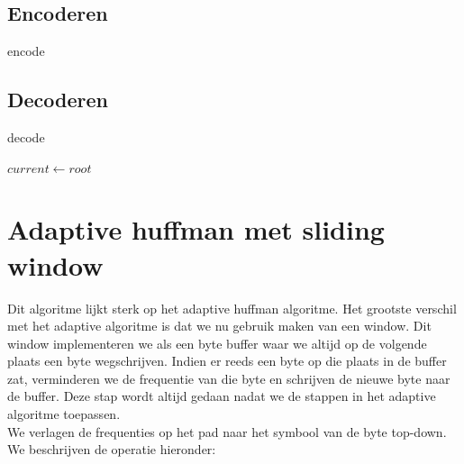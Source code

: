 \documentclass[a4paper,12pt]{report}
\begin{document}
\subsection{Encoderen}
\begin{algorithm}[H]
\caption{encode}
\SetAlgoLined	
\DontPrintSemicolon
{}
\end{algorithm}

\subsection{Decoderen}
\begin{algorithm}[H]
\caption{decode}
\SetAlgoLined	
\DontPrintSemicolon
{}
	$current \gets root$\;
\end{algorithm}

\section{Adaptive huffman met sliding window}
Dit algoritme lijkt sterk op het adaptive huffman algoritme. Het grootste verschil met het adaptive algoritme is dat we nu gebruik maken van een window. Dit window implementeren we als een byte buffer waar we altijd op de volgende plaats een byte wegschrijven. Indien er reeds een byte op die plaats in de buffer zat, verminderen we de frequentie van die byte en schrijven de nieuwe byte naar de buffer. Deze stap wordt altijd gedaan nadat we de stappen in het adaptive algoritme toepassen. \\

We verlagen de frequenties op het pad naar het symbool van de byte top-down. \\
We beschrijven de  operatie hieronder:
\end{document}
